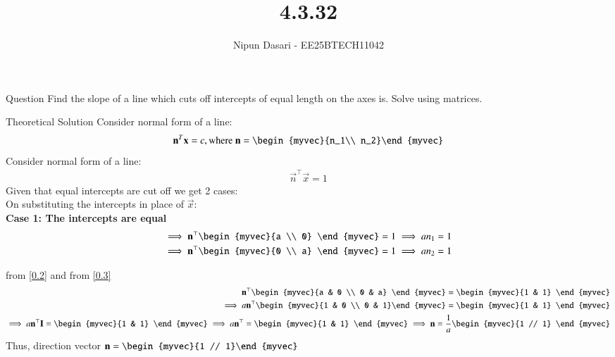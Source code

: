 \documentclass{beamer}
\title %
{4.3.32}
\author %
{Nipun Dasari - EE25BTECH11042}
\begin{document}
	
	\frame{\titlepage}
	\begin{frame}{Question}
		Find the slope of a line which cuts off intercepts of equal length on the axes is. Solve using matrices. \\
	\end{frame}
	
	
	\begin{frame}{Theoretical Solution}
	Consider normal form of a line:
	\begin{align}
		\vec{n}^T\vec{x} = c, \text{where } \vec{n} = \begin{myvec}{n_1\\ n_2}\end{myvec}
	\end{align}
Consider normal form of a line:
\begin{align}
	\vec{n}^\top\vec{x} = 1
\end{align}
Given that equal intercepts are cut off we get 2 cases:\\
On substituting the intercepts in place of $\vec{x}$: \\
\textbf{Case 1: The intercepts are equal }
\begin{align}
	\implies  \vec{n}^\top\begin{myvec}{a \\ 0} \end{myvec} = 1 \implies an_1 = 1 \label{0.2}\\
	\implies \vec{n}^\top\begin{myvec}{0 \\ a} \end{myvec} = 1 \implies an_2 = 1 \label{0.3} \\
\end{align}

from \eqref{0.2} and from \eqref{0.3}
\begin{align}
	\vec{n}^\top\begin{myvec}{a & 0 \\ 0 & a} \end{myvec} = \begin{myvec}{1 & 1} \end{myvec} \\
	\implies a\vec{n}^\top\begin{myvec}{1 & 0 \\ 0 & 1}\end{myvec} = \begin{myvec}{1 & 1} \end{myvec}\\
	\implies a\vec{n}^\top\vec{I} = \begin{myvec}{1 & 1} \end{myvec}
	\implies a\vec{n}^\top = \begin{myvec}{1 & 1} \end{myvec}
	\implies \vec{n} = \frac{1}{a}\begin{myvec}{1 // 1} \end{myvec}
\end{align}
Thus, direction vector $\vec{n} = \begin{myvec}{1 // 1}\end{myvec}$
		
	\end{frame}
\end{document}

